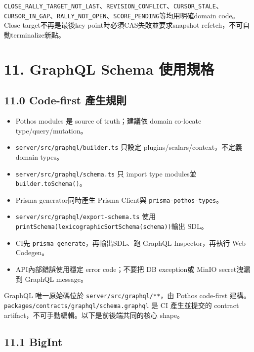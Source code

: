 \documentclass[
  9pt,
  a4paper,
]{article}
\providecommand{\tightlist}{%
  \setlength{\itemsep}{0pt}\setlength{\parskip}{0pt}}
\begin{document}
\texttt{CLOSE\_\allowbreak{}RALLY\_\allowbreak{}TARGET\_\allowbreak{}NOT\_\allowbreak{}LAST}、\texttt{REVISION\_\allowbreak{}CONFLICT}、\texttt{CURSOR\_\allowbreak{}STALE}、\texttt{CURSOR\_\allowbreak{}IN\_\allowbreak{}GAP}、\texttt{RALLY\_\allowbreak{}NOT\_\allowbreak{}OPEN}、\texttt{SCORE\_\allowbreak{}PENDING}等均用明確domain
code。Close target不再是最後key point時必須CAS失敗並要求snapshot
refetch，不可自動terminalize新點。

\section{11. GraphQL Schema
使用規格}\label{11-graphql-schema-ux4f7fux7528ux898fux683c}

\subsection{11.0 Code-first
產生規則}\label{110-code-first-ux7522ux751fux898fux5247}

\begin{itemize}
\tightlist
\item
  Pothos modules 是 source of truth；建議依 domain co-locate
  type/query/mutation。
\item
  \texttt{server/src/graphql/builder.ts} 只設定
  plugins/scalars/context，不定義 domain types。
\item
  \texttt{server/src/graphql/schema.ts} 只 import type modules並
  \texttt{builder.toSchema()}。
\item
  Prisma generator同時產生 Prisma Client與
  \texttt{prisma-pothos-types}。
\item
  \texttt{server/src/graphql/export-schema.ts} 使用
  \texttt{printSchema(lexicographicSortSchema(schema))}輸出 SDL。
\item
  CI先 \texttt{prisma\ generate}，再輸出SDL、跑 GraphQL
  Inspector，再執行 Web Codegen。
\item
  API內部錯誤使用穩定 error code；不要把 DB exception或 MinIO
  secret洩漏到 GraphQL message。
\end{itemize}

GraphQL 唯一原始碼位於 \texttt{server/src/graphql/**}，由 Pothos
code-first 建構。\texttt{packages/contracts/graphql/schema.graphql} 是
CI 產生並提交的 contract artifact，不可手動編輯。以下是前後端共同的核心
shape。

\subsection{11.1 BigInt}\label{111-bigint}
\end{document}
